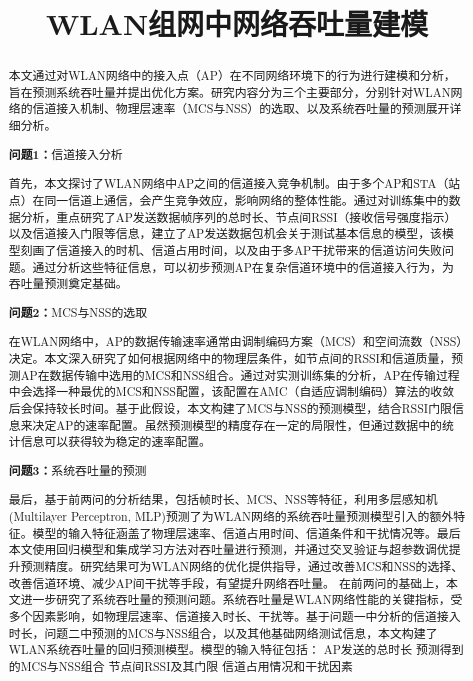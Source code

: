 \documentclass[bwprint]{gmcmthesis}
\title{WLAN组网中网络吞吐量建模}
\begin{document}
 \maketitle

\begin{abstract}
    
    本文通过对WLAN网络中的接入点（AP）在不同网络环境下的行为进行建模和分析，旨在预测系统吞吐量并提出优化方案。研究内容分为三个主要部分，分别针对WLAN网络的信道接入机制、物理层速率（MCS与NSS）的选取、以及系统吞吐量的预测展开详细分析。
    
    \textbf{问题1：}信道接入分析
   
    首先，本文探讨了WLAN网络中AP之间的信道接入竞争机制。由于多个AP和STA（站点）在同一信道上通信，会产生竞争效应，影响网络的整体性能。通过对训练集中的数据分析，重点研究了AP发送数据帧序列的总时长、节点间RSSI（接收信号强度指示）以及信道接入门限等信息，建立了AP发送数据包机会关于测试基本信息的模型，该模型刻画了信道接入的时机、信道占用时间，以及由于多AP干扰带来的信道访问失败问题。通过分析这些特征信息，可以初步预测AP在复杂信道环境中的信道接入行为，为吞吐量预测奠定基础。
   
    \textbf{问题2：}MCS与NSS的选取
   
    在WLAN网络中，AP的数据传输速率通常由调制编码方案（MCS）和空间流数（NSS）决定。本文深入研究了如何根据网络中的物理层条件，如节点间的RSSI和信道质量，预测AP在数据传输中选用的MCS和NSS组合。通过对实测训练集的分析，AP在传输过程中会选择一种最优的MCS和NSS配置，该配置在AMC（自适应调制编码）算法的收敛后会保持较长时间。基于此假设，本文构建了MCS与NSS的预测模型，结合RSSI门限信息来决定AP的速率配置。虽然预测模型的精度存在一定的局限性，但通过数据中的统计信息可以获得较为稳定的速率配置。
   
    \textbf{问题3：}系统吞吐量的预测
   
    最后，基于前两问的分析结果，包括帧时长、MCS、NSS等特征，利用多层感知机(Multilayer Perceptron, MLP)预测了为WLAN网络的系统吞吐量预测模型引入的额外特征。模型的输入特征涵盖了物理层速率、信道占用时间、信道条件和干扰情况等。最后本文使用回归模型和集成学习方法对吞吐量进行预测，并通过交叉验证与超参数调优提升预测精度。研究结果可为WLAN网络的优化提供指导，通过改善MCS和NSS的选择、改善信道环境、减少AP间干扰等手段，有望提升网络吞吐量。
   在前两问的基础上，本文进一步研究了系统吞吐量的预测问题。系统吞吐量是WLAN网络性能的关键指标，受多个因素影响，如物理层速率、信道接入时长、干扰等。基于问题一中分析的信道接入时长，问题二中预测的MCS与NSS组合，以及其他基础网络测试信息，本文构建了WLAN系统吞吐量的回归预测模型。模型的输入特征包括：
   AP发送的总时长
   预测得到的MCS与NSS组合
   节点间RSSI及其门限
   信道占用情况和干扰因素
   

\end{abstract}
\end{document}
